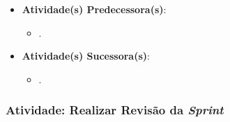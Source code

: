 \begin{itemize}
{\begin{itemize}
						\end{itemize}}
					\item{\textbf{Atividade(s) Predecessora(s)}:
						\begin{itemize}
							\item{.}
						\end{itemize}}
					\item{\textbf{Atividade(s) Sucessora(s)}:
						\begin{itemize}
							\item{.}
						\end{itemize}}
				\end{itemize}

			\subsubsection[Atividade: Realizar Revisão da \emph{Sprint}]{Atividade: Realizar Revisão da \emph{Sprint}}
			\label{subsubsec:processo_atividade_time_revisao}
